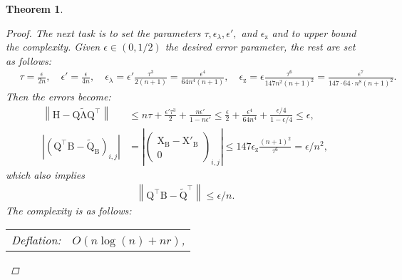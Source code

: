 \documentclass{article}
\newcommand{\labs}{\left|}
\newcommand{\rabs}{\right|}
\newcommand{\lnorm}{\left\|}
\newcommand{\rnorm}{\right\|}
\newcommand{\lpar}{\left(}
\newcommand{\rpar}{\right)}
\newtheorem{theorem}{Theorem}[section]
\newcommand\vecz{\boldsymbol{\mathrm{z}}}
\newcommand\matB{\boldsymbol{\mathrm{B}}}
\newcommand\matH{\boldsymbol{\mathrm{H}}}
\newcommand\matQ{\boldsymbol{\mathrm{Q}}}
\newcommand\matX{\boldsymbol{\mathrm{X}}}
\newcommand\matQtilde{\widetilde{\boldsymbol{\mathrm{Q}}}}
\newcommand\matLambdatilde{\widetilde{\boldsymbol{\mathrm{\Lambda}}}}
\begin{document}
\begin{theorem}
\begin{proof}
        The next task is to set the parameters $\tau,\epsilon_{\lambda}, \epsilon',$ and $\epsilon_{\vecz}$ and to upper bound the complexity. Given $\epsilon\in(0,1/2)$ the desired error parameter, the rest are set as follows:
        \begin{align*}
            \quad
            \tau=\tfrac{\epsilon}{2n},
            \quad
            \epsilon'=\tfrac{\epsilon}{4n},
            \quad
            \epsilon_{\lambda}
            =
            \epsilon'\tfrac{\tau^3}{2(n+1)}
            =
            \tfrac{\epsilon^4}{64n^4(n+1)}
            ,
            \quad
            \epsilon_{\vecz}=
            \epsilon\tfrac{\tau^6}{147n^2(n+1)^2}
            =
            \tfrac{\epsilon^7}{147\cdot 64\cdot n^8(n+1)^2}.
        \end{align*}
        Then the errors become:
        \begin{align*}
            \lnorm
                \matH-\matQ\matLambdatilde\matQ^\top
            \rnorm
            &\leq
            n\tau 
            + 
            \frac{\epsilon'\tau^3}{2} + \frac{n\epsilon'}{1-n\epsilon'}
            \leq
            \frac{\epsilon}{2} 
            + 
            \frac{\epsilon^4}{64n^4}
            + 
            \frac{\epsilon/4}{1-\epsilon/4}
            \leq
            \epsilon
            ,\\
            \labs
            \lpar
            \matQ^\top\matB -\matQtilde_{\matB}
            \rpar_{i,j}
            \rabs
            &=
            \labs
                \begin{pmatrix}
                    \matX_{\matB}- \matX'_{\matB} \\
                    0
                \end{pmatrix}_{i,j}
            \rabs
            \leq 
            147\epsilon_{\vecz}
                \frac{(n+1)^2}{\tau^6}
            = 
            \epsilon/n^2,
        \end{align*} 
        which also implies
        \begin{align}
            \label{eq:theorem_arrowhead_diagonalization_normwise_eigenvector_bound}
            \lnorm \matQ^\top\matB-\matQtilde^\top \rnorm \leq \epsilon/n.
        \end{align}
        The complexity is as follows:\\
        \begin{tabular}{r l}
            Deflation:
            &
            $O\lpar n\log(n) + nr\rpar$,
            \\

\end{tabular}
\end{proof}
\end{theorem}
\end{document}
